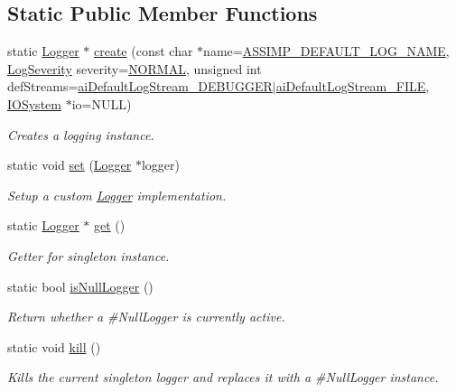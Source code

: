 \subsection*{Static Public Member Functions}
\begin{DoxyCompactItemize}
\item 
static \hyperlink{class_assimp_1_1_logger}{Logger} $\ast$ \hyperlink{class_assimp_1_1_default_logger_adccb11f85f8b0ef226c382e11ba665c3}{create} (const char $\ast$name=\hyperlink{_default_logger_8hpp_a5e31e6d6c9f8a8954134f3da38fec0a0}{A\-S\-S\-I\-M\-P\-\_\-\-D\-E\-F\-A\-U\-L\-T\-\_\-\-L\-O\-G\-\_\-\-N\-A\-M\-E}, \hyperlink{class_assimp_1_1_logger_a8b6248a0fd062431e8572556350d29e6}{Log\-Severity} severity=\hyperlink{class_assimp_1_1_logger_a8b6248a0fd062431e8572556350d29e6a79d16f85dc21486ee489f300027e8eda}{N\-O\-R\-M\-A\-L}, unsigned int def\-Streams=\hyperlink{types_8h_ae4271f61a7c06cd4770fc3e11f58f9c6a424869369b939e649decec5cea6bb52c}{ai\-Default\-Log\-Stream\-\_\-\-D\-E\-B\-U\-G\-G\-E\-R}$\vert$\hyperlink{types_8h_ae4271f61a7c06cd4770fc3e11f58f9c6a53f81f9d36437ced72e67b297dc17815}{ai\-Default\-Log\-Stream\-\_\-\-F\-I\-L\-E}, \hyperlink{class_assimp_1_1_i_o_system}{I\-O\-System} $\ast$io=N\-U\-L\-L)
\begin{DoxyCompactList}\small\item\em Creates a logging instance. \end{DoxyCompactList}\item 
static void \hyperlink{class_assimp_1_1_default_logger_a9daba548026045b99813c760c2842ed2}{set} (\hyperlink{class_assimp_1_1_logger}{Logger} $\ast$logger)
\begin{DoxyCompactList}\small\item\em Setup a custom \hyperlink{class_assimp_1_1_logger_a784e6d1a741072b17bab32a6a41055e8}{Logger} implementation. \end{DoxyCompactList}\item 
static \hyperlink{class_assimp_1_1_logger}{Logger} $\ast$ \hyperlink{class_assimp_1_1_default_logger_a7d0a53f2db66945ade30094330a77ba4}{get} ()
\begin{DoxyCompactList}\small\item\em Getter for singleton instance. \end{DoxyCompactList}\item 
static bool \hyperlink{class_assimp_1_1_default_logger_abebc7ee702a2a2dde765e771948400c6}{is\-Null\-Logger} ()
\begin{DoxyCompactList}\small\item\em Return whether a \#\-Null\-Logger is currently active. \end{DoxyCompactList}\item 
\hypertarget{class_assimp_1_1_default_logger_a0b1da096d7442af5a4a4cb5ebb2540f7}{static void \hyperlink{class_assimp_1_1_default_logger_a0b1da096d7442af5a4a4cb5ebb2540f7}{kill} ()}\label{class_assimp_1_1_default_logger_a0b1da096d7442af5a4a4cb5ebb2540f7}

\begin{DoxyCompactList}\small\item\em Kills the current singleton logger and replaces it with a \#\-Null\-Logger instance. \end{DoxyCompactList}\end{DoxyCompactItemize}
